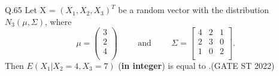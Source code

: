 \documentclass[journal,12pt,onecolumn]{IEEEtran}
\theoremstyle{remark}
\begin{document}
\\
\\
Q.65 Let X = $(X_1, X_2, X_3)^T$ be a random vector with the distribution $N_3(\mu, \Sigma)$, where 
\[
\mu = \begin{pmatrix}
	3 \\
	2 \\
	4\\
\end{pmatrix}
\hspace{1cm} \text{and} \hspace{1cm} \Sigma = \begin{bmatrix}
	4 & 2 & 1 \\
	2 & 3 & 0 \\
	1 & 0 & 2 \\
\end{bmatrix}.
\]
Then $E(X_1|X_2 = 4, X_3 = 7)$ (\textbf{in integer}) is equal to \underline{\hspace{2cm}}.\hfill (GATE ST 2022)
	
\end{document}
